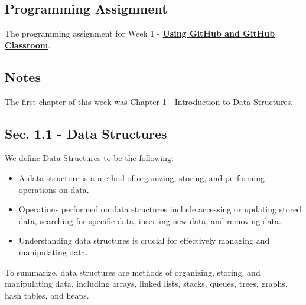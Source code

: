 \subsection{Programming Assignment}

The programming assignment for Week 1 - \href{https://github.com/cu-cspb-2270-Summer-2023/pa0-RelativiBit}{\textbf{Using GitHub and GitHub Classroom}}. \\

\subsection{Notes}
The first chapter of this week was Chapter 1 - Introduction to Data Structures. \\

\subsection*{Sec. 1.1 - Data Structures}
\noindent We define Data Structures to be the following:
\begin{itemize}
    \item A data structure is a method of organizing, storing, and performing operations on data.
    \item Operations performed on data structures include accessing or updating stored data, searching for specific data, inserting new data, and removing data.
    \item Understanding data structures is crucial for effectively managing and manipulating data.
\end{itemize}
To summarize, data structures are methods of organizing, storing, and manipulating data, including arrays, linked lists, stacks, queues, trees, graphs, hash tables,
and heaps. \\

